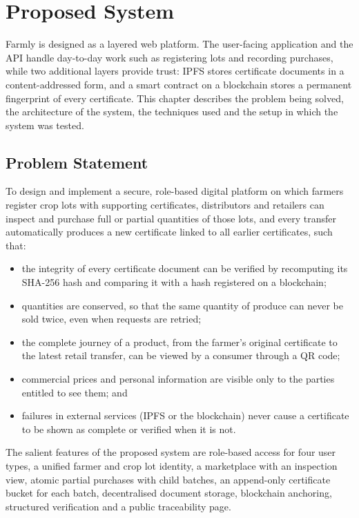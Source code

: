 \chapter{Proposed System}

Farmly is designed as a layered web platform. The user-facing application and the API handle day-to-day work such as registering lots and recording purchases, while two additional layers provide trust: IPFS stores certificate documents in a content-addressed form, and a smart contract on a blockchain stores a permanent fingerprint of every certificate. This chapter describes the problem being solved, the architecture of the system, the techniques used and the setup in which the system was tested.

\section{Problem Statement}
To design and implement a secure, role-based digital platform on which farmers register crop lots with supporting certificates, distributors and retailers can inspect and purchase full or partial quantities of those lots, and every transfer automatically produces a new certificate linked to all earlier certificates, such that:
\begin{itemize}
	\item the integrity of every certificate document can be verified by recomputing its SHA-256 hash and comparing it with a hash registered on a blockchain;
	\item quantities are conserved, so that the same quantity of produce can never be sold twice, even when requests are retried;
	\item the complete journey of a product, from the farmer's original certificate to the latest retail transfer, can be viewed by a consumer through a QR code;
	\item commercial prices and personal information are visible only to the parties entitled to see them; and
	\item failures in external services (IPFS or the blockchain) never cause a certificate to be shown as complete or verified when it is not.
\end{itemize}

The salient features of the proposed system are role-based access for four user types, a unified farmer and crop lot identity, a marketplace with an inspection view, atomic partial purchases with child batches, an append-only certificate bucket for each batch, decentralised document storage, blockchain anchoring, structured verification and a public traceability page.

